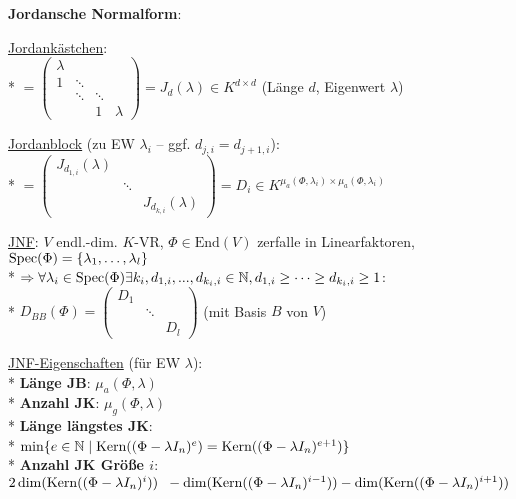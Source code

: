 \textbf{Jordansche Normalform}:
\begin{items}
  \item \underline{Jordankästchen}: \\* \( = \left( \begin{smallmatrix}
    \lambda &  &  &  \\
    1 & \ddots &  &  \\
     & \ddots & \ddots &  \\
      & & 1 & \lambda
  \end{smallmatrix} \right) = J_d(\lambda) \in K^{d \times d} \) (Länge \( d \), Eigenwert \( \lambda \))

  \item \underline{Jordanblock} (zu EW \( \lambda_i \) -- ggf. \( d_{j,i} = d_{j+1,i} \)): \\*
    \( = \left( \begin{smallmatrix}
      J_{d_{1,i}}(\lambda) & &  \\
       & \ddots & \\
        & & J_{d_{k,i}}(\lambda)
    \end{smallmatrix} \right) = D_i \in K^{\mu_a(\Phi, \lambda_i) \times \mu_a(\Phi, \lambda_i) } \)

  \item \underline{JNF}: \( V \) endl.-dim. \( K \)-VR, \( \Phi \in \text{End}(V) \) zerfalle in Linearfaktoren, \( \text{Spec}(\Phi) = \{ \lambda_1, \dots, \lambda_l \} \)
    \\*
    \( \Rightarrow \forall \lambda_i \in \text{Spec}(\Phi) \exists k_i, d_{1,i}, ..., d_{k_i,i} \in \mathbb{N}, d_{1,i} \geq \cdots \geq d_{k_i,i} \geq 1 \): 
    \\*
    \( D_{BB}(\Phi) = \left( \begin{smallmatrix}
      D_1 & & \\
       & \ddots & \\
        & & D_l
    \end{smallmatrix} \right) \) (mit Basis \( B \) von \( V \))

  \item \underline{JNF-Eigenschaften} (für EW \( \lambda \)): \\*
    \textbf{Länge JB}: \( \mu_a(\Phi, \lambda) \) \\*
    \textbf{Anzahl JK}: \( \mu_g(\Phi, \lambda) \) \\*
    \textbf{Länge längstes JK}:  \\* \phantom{x} \( \min\{ e \in \mathbb{N} \mid \text{Kern}((\Phi - \lambda I_n)^e) = \text{Kern}((\Phi - \lambda I_n)^{e+1}) \}  \) \\*
    \textbf{Anzahl JK Größe \( i \)}: \( 2\dim(\text{Kern}((\Phi - \lambda I_n)^i)) \\* \phantom{x} - \dim(\text{Kern}((\Phi - \lambda I_n)^{i-1})) - \dim(\text{Kern}((\Phi - \lambda I_n)^{i+1})) \)


\end{items}
